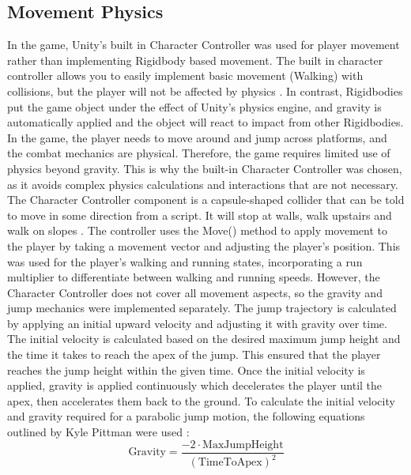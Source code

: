 \documentclass[10pt]{final_report}
\begin{document}
\subsection{Movement Physics}\label{physics}
In the game, Unity's built in Character Controller was used for player movement rather than implementing Rigidbody based movement. The built in character controller allows you to easily implement basic movement (Walking) with collisions, but the player will not be affected by physics \cite{unity2024_charactercontroller}. In contrast, Rigidbodies put the game object under the effect of Unity's physics engine, and gravity is automatically applied and the object will react to impact from other Rigidbodies. In the game, the player needs to move around and jump across platforms, and the combat mechanics are physical. Therefore, the game requires limited use of physics beyond gravity.  This is why the built-in Character Controller was chosen, as it avoids complex physics calculations and interactions that are not necessary. \newline
The Character Controller component is a capsule-shaped collider that can be told to move in some direction from a script. It will stop at walls, walk upstairs and walk on slopes \cite{unity2024_charactercontroller_reference}. The controller uses the Move() method to apply movement to the player by taking a movement vector and adjusting the player's position. This was used for the player's walking and running states, incorporating a run multiplier to differentiate between walking and running speeds. However, the Character Controller does not cover all movement aspects, so the gravity and jump mechanics were implemented separately.  \newline
The jump trajectory is calculated by applying an initial upward velocity and adjusting it with gravity over time. The initial velocity is calculated based on the desired maximum jump height and the time it takes to reach the apex of the jump. This ensured that the player reaches the jump height within the given time. Once the initial velocity is applied, gravity is applied continuously which decelerates the player until the apex, then accelerates them back to the ground. To calculate the initial velocity and gravity required for a parabolic jump motion, the following equations outlined by Kyle Pittman were used \cite{pittman2016_jump}:
\begin{equation}
\text{Gravity} = \frac{-2 \cdot \text{MaxJumpHeight}}{(\text{TimeToApex})^2}
\end{equation}
\end{document}
